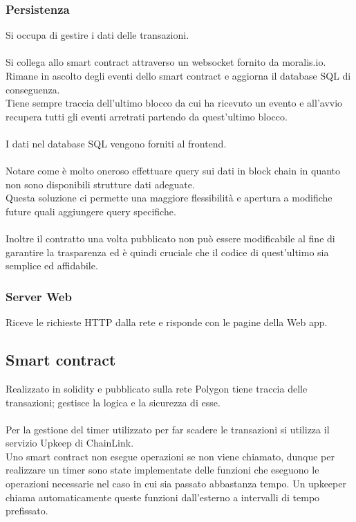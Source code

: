\documentclass[a4paper, 12pt]{article}
\begin{document}
\subsubsection{Persistenza}
Si occupa di gestire i dati delle transazioni.\\\\
Si collega allo smart contract attraverso un websocket fornito da moralis.io.\\
Rimane in ascolto degli eventi dello smart contract e
aggiorna il database SQL di conseguenza.\\
Tiene sempre traccia dell'ultimo blocco da cui ha ricevuto un evento
e all'avvio recupera tutti gli eventi arretrati partendo da quest'ultimo blocco.\\\\
I dati nel database SQL vengono forniti al frontend.\\\\
Notare come è molto oneroso
effettuare query sui dati in block chain in quanto non sono disponibili strutture dati adeguate.\\
Questa soluzione ci permette una maggiore flessibilità e apertura a modifiche future quali aggiungere query specifiche.\\\\
Inoltre il contratto una volta pubblicato non può essere modificabile al fine di garantire la trasparenza ed è quindi cruciale
che il codice di quest'ultimo sia semplice ed affidabile.
\subsubsection{Server Web}
Riceve le richieste HTTP dalla rete e risponde con le pagine della Web app.

\subsection{Smart contract}
Realizzato in solidity e pubblicato sulla rete Polygon tiene traccia delle transazioni; gestisce la logica e la sicurezza di esse.\\\\
Per la gestione del timer utilizzato per far scadere le transazioni si utilizza il servizio Upkeep di ChainLink.\\
Uno smart contract non esegue operazioni se non viene chiamato, dunque per realizzare un timer sono state implementate delle funzioni che
eseguono le operazioni necessarie nel caso in cui sia passato abbastanza tempo. Un upkeeper chiama automaticamente queste funzioni dall'esterno a intervalli di tempo prefissato.
\end{document}
